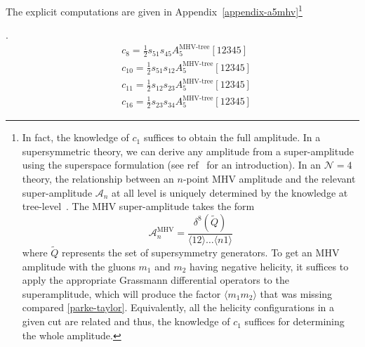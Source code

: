 The explicit computations are given in Appendix~\ref{appendix-a5mhv}\footnote{
In fact, the knowledge of $c_1$ suffices to obtain the full amplitude.
In a supersymmetric theory, we can derive any amplitude from a super-amplitude using the superspace formulation (see \eg ref~\cite{Elvang:2013cua} for an introduction). 
In an $\mathcal{N} = 4$ theory, the relationship between an $n$-point MHV amplitude and the relevant super-amplitude $\mathcal{A}_n$ at all level is uniquely determined by the knowledge at tree-level~\cite{Elvang:2010xn}.
The MHV super-amplitude takes the form 
\begin{equation}
\mathcal{A}_n^{\mathrm{MHV}} = \frac{\delta^{8}(\tilde{Q})}{\langle 12 \rangle \ldots \langle n 1\rangle}
\end{equation}
where $\tilde{Q}$ represents the set of supersymmetry generators.
To get an MHV amplitude with the gluons $m_1$ and $m_2$ having negative helicity, it suffices to apply the appropriate Grassmann differential operators to the superamplitude, which will produce the factor $\langle m_1 m_2\rangle$ that was missing compared \cref{parke-taylor}.
Equivalently, all the helicity configurations in a given cut are related and thus, the knowledge of $c_1$ suffices for determining the whole amplitude. 
}
%
\iffalse
\footnote{
In fact, the knowledge of $c_1$ suffices to obtain the full amplitude.
In a supersymmetric theory, we can derive any amplitude from a super-amplitude using the superspace formulation (see \eg ref~\cite{Elvang:2013cua} for an introduction). 
In an $\mathcal{N} = 4$ theory, the relationship between an $n$-point MHV amplitude and the relevant super-amplitude $\mathcal{A}_n$ at all level is uniquely determined by the knowledge at tree-level and is given by~\cite{Elvang:2010xn} 
\begin{equation}
\mathcal{A}_n^{\mathrm{MHV}} = \delta^{8}(\tilde{Q})\frac{1}{\langle n-1, n\rangle^4}A_n^{\mathrm{tree}}[+,+,\ldots,+,-,-]
\end{equation}
where $\tilde{Q}$ represents the set of supersymmetry generators.
As one can notice from this expression, the term on the right hand side should be cyclic. 
As a result, to determine the five-point MHV amplitude, it suffices to take~\cref{coef_c_1}, multiply it with the box integral $I_1$ corresponding to the configuration, pull out the factor $\langle 12 \rangle^4$ and symmetrize the rest.
The result matches exactly~\cref{final_result_a5mhv}.
}
\fi
%
.
\begin{equation}\label{remaining_a5}
\begin{split}
& c_8 = \frac{1}{2} s_{51}s_{45} A_5^{\textrm{MHV-tree}}[12345]
\\
& c_{10} = \frac{1}{2}s_{51}s_{12}A_5^{\textrm{MHV-tree}}[12345]
\\
& c_{11} = \frac{1}{2}s_{12}s_{23}A_5^{\textrm{MHV-tree}}[12345]
\\
& c_{16}= \frac{1}{2}s_{23}s_{34}A_5^{\textrm{MHV-tree}}[12345]
\end{split}
\end{equation}
%
%
\iffalse
